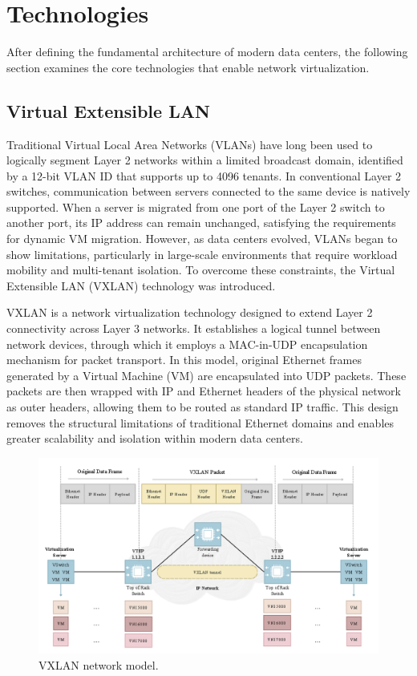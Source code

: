 \section{Technologies}
After defining the fundamental architecture of modern data centers, the following section examines the core technologies that enable network virtualization.

\subsection{Virtual Extensible LAN}
Traditional Virtual Local Area Networks (VLANs) have long been used to logically segment Layer 2 networks within a limited broadcast domain, identified by a 12-bit VLAN ID that supports up to 4096 tenants. In conventional Layer 2 switches, communication between servers connected to the same device is natively supported. When a server is migrated from one port of the Layer 2 switch to another port, its IP address can remain unchanged, satisfying the requirements for dynamic VM migration. However, as data centers evolved, VLANs began to show limitations, particularly in large-scale environments that require workload mobility and multi-tenant isolation. To overcome these constraints, the Virtual Extensible LAN (VXLAN) technology was introduced.

VXLAN is a network virtualization technology designed to extend Layer 2 connectivity across Layer 3 networks. It establishes a logical tunnel between network devices, through which it employs a MAC-in-UDP encapsulation mechanism for packet transport. In this model, original Ethernet frames generated by a Virtual Machine (VM) are encapsulated into UDP packets. These packets are then wrapped with IP and Ethernet headers of the physical network as outer headers, allowing them to be routed as standard IP traffic. This design removes the structural limitations of traditional Ethernet domains and enables greater scalability and isolation within modern data centers.

\begin{figure} [H]
    \centering
    \includegraphics[width=0.9\linewidth]{Figures/VXLANmodel.png}
    \caption{VXLAN network model.}
    \label{VXLANmodel}
\end{figure}


